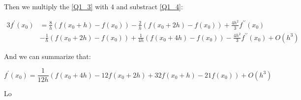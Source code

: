 \begin{solution}
Then we multiply the \ref{Q1_3} with 4 and substract \ref{Q1_4}:


\begin{equation}
\begin{aligned}
3 f^{\prime}\left(x_{0}\right) &=\frac{8}{h}\left(f\left(x_{0}+h\right)-f\left(x_{0}\right)\right)-\frac{2}{h}\left(f\left(x_{0}+2 h\right)-f\left(x_{0}\right)\right)+\frac{4 h^{2}}{3} f^{\prime \prime}\left(x_{0}\right) \\
&-\frac{1}{h}\left(f\left(x_{0}+2 h\right)-f\left(x_{0}\right)\right)+\frac{1}{4 h}\left(f\left(x_{0}+4 h\right)-f\left(x_{0}\right)\right)-\frac{4 h^{2}}{3} f^{\prime \prime}\left(x_{0}\right)+O\left(h^{3}\right)
\end{aligned}
\end{equation}

And we can summarize that:


\begin{equation}
f^{\prime}\left(x_{0}\right)=\frac{1}{12 h}\left(f\left(x_{0}+4 h\right)-12 f(x_0+2 h)+32 f\left(x_{0}+h\right)-21 f\left(x_{0}\right)\right)+O\left(h^{3}\right)
\end{equation}






\end{solution}





Lo